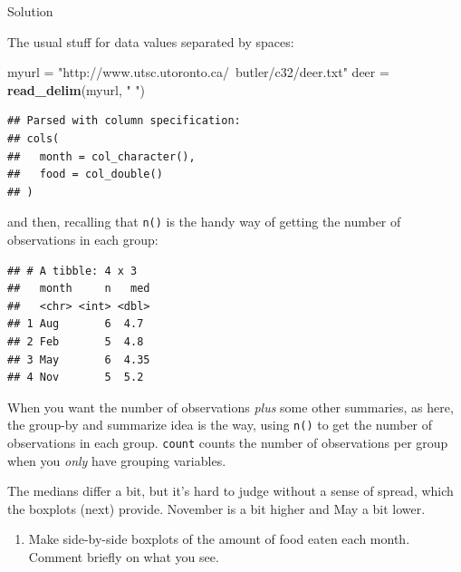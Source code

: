 \documentclass[]{tufte-book}
\newenvironment{Shaded}{}{}
\newcommand{\DataTypeTok}[1]{\textcolor[rgb]{0.56,0.13,0.00}{#1}}
\newcommand{\KeywordTok}[1]{\textcolor[rgb]{0.00,0.44,0.13}{\textbf{#1}}}
\newcommand{\NormalTok}[1]{#1}
\newcommand{\OperatorTok}[1]{\textcolor[rgb]{0.40,0.40,0.40}{#1}}
\newcommand{\StringTok}[1]{\textcolor[rgb]{0.25,0.44,0.63}{#1}}
\providecommand{\tightlist}{%
  \setlength{\itemsep}{0pt}\setlength{\parskip}{0pt}}
\theoremstyle{definition}
\theoremstyle{definition}
\theoremstyle{definition}
\theoremstyle{remark}
\begin{document}
Solution

The usual stuff for data values separated by spaces:

\begin{Shaded}
\begin{Highlighting}[]
\NormalTok{myurl =}\StringTok{ "http://www.utsc.utoronto.ca/~butler/c32/deer.txt"}
\NormalTok{deer =}\StringTok{ }\KeywordTok{read_delim}\NormalTok{(myurl, }\StringTok{" "}\NormalTok{)}
\end{Highlighting}
\end{Shaded}

\begin{verbatim}
## Parsed with column specification:
## cols(
##   month = col_character(),
##   food = col_double()
## )
\end{verbatim}

and then, recalling that \texttt{n()} is the handy way of getting the
number of observations in each group:

\begin{Shaded}
\end{Shaded}

\begin{verbatim}
## # A tibble: 4 x 3
##   month     n   med
##   <chr> <int> <dbl>
## 1 Aug       6  4.7 
## 2 Feb       5  4.8 
## 3 May       6  4.35
## 4 Nov       5  5.2
\end{verbatim}

When you want the number of observations \emph{plus} some other
summaries, as here, the group-by and summarize idea is the way, using
\texttt{n()} to get the number of observations in each group.
\texttt{count} counts the number of observations per group when you
\emph{only} have grouping variables.

The medians differ a bit, but it's hard to judge without a sense of
spread, which the boxplots (next) provide. November is a bit higher and
May a bit lower.

\begin{enumerate}
\def\labelenumi{(\alph{enumi})}
\setcounter{enumi}{1}
\tightlist
\item
  Make side-by-side boxplots of the amount of food eaten each month.
  Comment briefly on what you see.
\end{enumerate}
\end{document}
